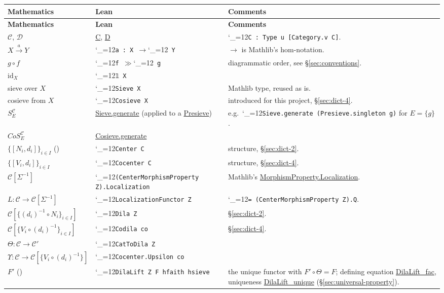 \documentclass[11pt]{amsart}
\newcommand{\lc}[1]{\url{#1}}
\newcommand{\lcode}{\begingroup\catcode`\_=12\relax\lcodeInner}
\newcommand{\lcodeInner}[1]{\texttt{#1}\endgroup}
\theoremstyle{plain}
\theoremstyle{definition}
\theoremstyle{remark}
\newcommand{\calC}{\mathcal C}
\newcommand{\calD}{\mathcal D}
\newcommand{\id}{\mathrm{id}}
\begin{document}
\begingroup
\renewcommand{\arraystretch}{1.15}
\begin{longtable}{@{}p{2.3cm}p{3.9cm}p{5.1cm}@{}}
\toprule
\textbf{Mathematics} & \textbf{Lean} & \textbf{Comments} \\
\midrule
\endfirsthead
\toprule
\textbf{Mathematics} & \textbf{Lean} & \textbf{Comments} \\
\midrule
\endhead
\bottomrule
\endfoot
$\calC$, $\calD$ & \lc{C}, \lc{D} & \lcode{{C : Type u} [Category.{v} C]}. \\
$X \xrightarrow{a} Y$ & \lcode{a : X }\ensuremath{\longrightarrow}\lcode{ Y} & \ensuremath{\longrightarrow} is Mathlib's hom-notation. \\
$g \circ f$ & \lcode{f }\ensuremath{\gg}\lcode{ g} & diagrammatic order, see \S\ref{sec:conventions}. \\
$\id_X$ & \lcode{𝟙 X} & \\
sieve over $X$ & \lcode{Sieve X} & Mathlib type, reused as is. \\
cosieve from $X$ & \lcode{Cosieve X} & introduced for this project, \S\ref{sec:dict-4}. \\
$S^{\calC}_E$ & \lc{Sieve.generate} (applied to a \lc{Presieve}) & e.g.\ \lcode{Sieve.generate (Presieve.singleton g)} for $E=\{g\}$. \\
$CoS^{\calC}_E$ & \lc{Cosieve.generate} & \\
$\{[N_i,d_i]\}_{i\in I}$ (\citep[Definition~2.9]{Mayeux}) & \lcode{Center C} & structure, \S\ref{sec:dict-2}. \\
$\{[V_i,d_i]\}_{i\in I}$ & \lcode{Cocenter C} & structure, \S\ref{sec:dict-4}. \\
$\calC[\Sigma^{-1}]$ & \lcode{(Center\allowbreak MorphismProperty Z).\allowbreak Localization} & Mathlib's \lc{MorphismProperty.Localization}. \\
$L : \calC \to \calC[\Sigma^{-1}]$ & \lcode{LocalizationFunctor Z} & \lcode{= (CenterMorphismProperty Z).Q}. \\
$\calC[\{(d_i)^{-1}\circ N_i\}_{i\in I}]$ & \lcode{Dila Z} & \S\ref{sec:dict-2}. \\
$\calC[\{V_i \circ (d_i)^{-1}\}_{i\in I}]$ & \lcode{Codila co} & \S\ref{sec:dict-4}. \\
$\Theta : \calC \to \calC'$ & \lcode{CatToDila Z} & \\
$\Upsilon : \calC \to \calC[\{V_i\circ(d_i)^{-1}\}]$ & \lcode{Cocenter.Upsilon co} & \\
$F'$ (\citep[Theorem~3.10]{Mayeux}) & \lcode{DilaLift Z F hfaith hsieve} & the unique functor with $F' \circ \Theta = F$; defining equation \lc{DilaLift_fac}, uniqueness \lc{DilaLift_unique} (\S\ref{sec:universal-property}). \\

\end{longtable}
\end{document}
